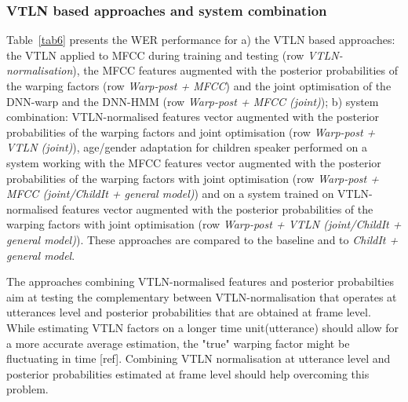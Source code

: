 \documentclass{nle}
\begin{document}
\subsubsection{VTLN based approaches and system combination}
Table~\ref{tab6} presents the WER performance for a) the VTLN based approaches: the VTLN applied to MFCC during training and testing (row {\em VTLN-normalisation}), the MFCC features augmented with the posterior probabilities of the warping factors (row {\em Warp-post + MFCC}) and the joint optimisation of the DNN-warp and the DNN-HMM (row {\em Warp-post + MFCC (joint)}); b) system combination: VTLN-normalised features vector augmented with the posterior probabilities of the warping factors and joint optimisation (row {\em Warp-post + VTLN (joint)}), age/gender adaptation for children speaker performed on a system working with the MFCC features vector augmented with the posterior probabilities of the warping factors with joint optimisation (row {\em Warp-post + MFCC (joint/ChildIt + general model)}) and on a system trained on VTLN-normalised features vector augmented with the posterior probabilities of the warping factors with joint optimisation (row {\em Warp-post + VTLN (joint/ChildIt + general model)}). These approaches are compared to the baseline and to {\em ChildIt + general model}. 

The approaches combining VTLN-normalised features and posterior probabilties aim at testing the complementary between VTLN-normalisation that operates at utterances level and posterior probabilities that are obtained at frame level. While estimating VTLN factors on a longer time unit(utterance) should allow for a more accurate average estimation, the "true" warping factor might be fluctuating in time [ref]. Combining VTLN normalisation at utterance level and posterior probabilities estimated at frame level should help overcoming this problem.
\end{document}
